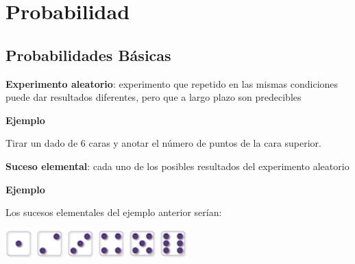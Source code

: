 \documentclass[]{book}
\begin{document}
\hypertarget{probabilidad}{%
\chapter{Probabilidad}\label{probabilidad}}

\hypertarget{probabilidades-buxe1sicas}{%
\section{Probabilidades Básicas}\label{probabilidades-buxe1sicas}}

\textbf{Experimento aleatorio}: experimento que repetido en las mismas condiciones puede dar resultados diferentes, pero que a largo plazo son predecibles

\textbf{Ejemplo}

Tirar un dado de 6 caras y anotar el número de puntos de la cara superior.

\textbf{Suceso elemental}: cada uno de los posibles resultados del experimento aleatorio

\textbf{Ejemplo}

Los sucesos elementales del ejemplo anterior serían:

\includegraphics[width=0.42in]{Images/proba1dibujos/dice/1}
\includegraphics[width=0.42in]{Images/proba1dibujos/dice/2}
\includegraphics[width=0.42in]{Images/proba1dibujos/dice/3}
\includegraphics[width=0.42in]{Images/proba1dibujos/dice/4}
\includegraphics[width=0.42in]{Images/proba1dibujos/dice/5}
\includegraphics[width=0.42in]{Images/proba1dibujos/dice/6}
\end{document}
